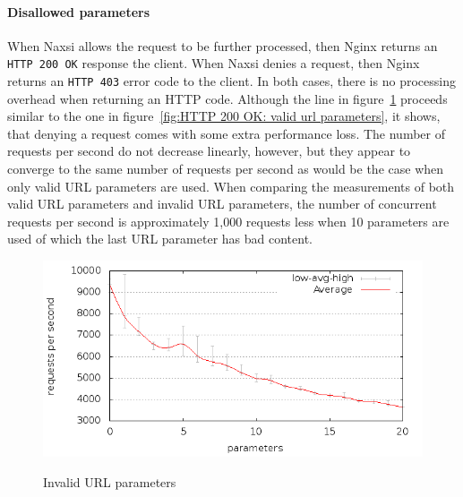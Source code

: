\documentclass[Experiments]{subfiles}
\begin{document}
\paragraph{Disallowed parameters}
When Naxsi allows the request to be further processed, then Nginx returns an \verb+HTTP 200 OK+ response the client. When Naxsi denies a request, then Nginx returns an \verb+HTTP 403+ error code to the client. In both cases, there is no processing overhead when returning an HTTP code. Although the line in figure~\ref{fig:HTTP 200 OK: invalid url parameters} proceeds similar to the one in figure~\ref{fig:HTTP 200 OK: valid url parameters}, it shows, that denying a request comes with some extra performance loss. The number of requests per second do not decrease linearly, however, but they appear to converge to the same number of requests per second as would be the case when only valid \ac{URL} parameters are used. When comparing the measurements of both valid \ac{URL} parameters and invalid \ac{URL} parameters, the number of concurrent requests per second is approximately 1,000 requests less when 10 parameters are used of which the last \ac{URL} parameter has bad content.

\begin{figure}[H]
\caption{Invalid URL parameters}
\centering
\includegraphics[scale=0.55] {images/results/200_with_naxsi_incremented_disallowed_parameters/output.png}
\label{fig:HTTP 200 OK: invalid url parameters}
\end{figure}
\end{document}
